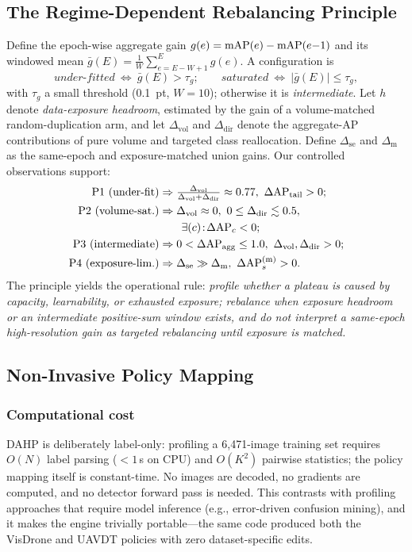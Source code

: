 \documentclass[journal]{IEEEtran}
\newcommand{\map}{\textup{mAP}}
\newcommand{\ap}{\textup{AP}}
\begin{document}
\subsection{The Regime-Dependent Rebalancing Principle}
\label{sec:law}
Define the epoch-wise aggregate gain $g(e)=\map(e)-\map(e{-}1)$ and its windowed mean $\bar{g}(E)=\frac{1}{W}\sum_{e=E-W+1}^{E}g(e)$. A configuration is
\begin{equation}
\textit{under-fitted}\ \Leftrightarrow\ \bar{g}(E)>\tau_g;\qquad
\textit{saturated}\ \Leftrightarrow\ |\bar{g}(E)|\le\tau_g,
\label{eq:regime}
\end{equation}
with $\tau_g$ a small threshold (0.1~pt, $W{=}10$); otherwise it is \emph{intermediate}. Let $h$ denote \emph{data-exposure headroom}, estimated by the gain of a volume-matched random-duplication arm, and let $\Delta_{\mathrm{vol}}$ and $\Delta_{\mathrm{dir}}$ denote the aggregate-\ap{} contributions of pure volume and targeted class reallocation. Define $\Delta_{\mathrm{se}}$ and $\Delta_{\mathrm{m}}$ as the same-epoch and exposure-matched union gains. Our controlled observations support:
\begin{align}
\text{P1 (under-fit)} &\Rightarrow \tfrac{\Delta_{\mathrm{vol}}}{\Delta_{\mathrm{vol}}+\Delta_{\mathrm{dir}}}\approx0.77,\ \Delta\ap_{\mathrm{tail}}>0;\\
\text{P2 (volume-sat.)} &\Rightarrow \Delta_{\mathrm{vol}}\approx0,\ 0\le\Delta_{\mathrm{dir}}\lesssim0.5,\\
&\qquad \exists(c)\!:\!\Delta\ap_c<0;\\
\text{P3 (intermediate)} &\Rightarrow 0<\Delta\ap_{\mathrm{agg}}\le 1.0,\ \Delta_{\mathrm{vol}},\Delta_{\mathrm{dir}}>0;\\
\text{P4 (exposure-lim.)} &\Rightarrow \Delta_{\mathrm{se}}\gg\Delta_{\mathrm{m}},\ \Delta\ap_s^{(\mathrm{m})}>0.
\end{align}
The principle yields the operational rule: \emph{profile whether a plateau is caused by capacity, learnability, or exhausted exposure; rebalance when exposure headroom or an intermediate positive-sum window exists, and do not interpret a same-epoch high-resolution gain as targeted rebalancing until exposure is matched.}

\subsection{Non-Invasive Policy Mapping}
\subsubsection{Computational cost}
DAHP is deliberately label-only: profiling a 6{,}471-image training set requires $O(N)$ label parsing ($<1$\,s on CPU) and $O(K^2)$ pairwise statistics; the policy mapping itself is constant-time. No images are decoded, no gradients are computed, and no detector forward pass is needed. This contrasts with profiling approaches that require model inference (e.g., error-driven confusion mining), and it makes the engine trivially portable---the same code produced both the VisDrone and UAVDT policies with zero dataset-specific edits.
\end{document}
